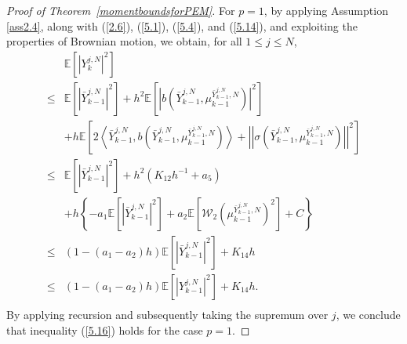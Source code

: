 \documentclass[12pt]{article}
\numberwithin{equation}{section}
\begin{document}
\begin{proof}[Proof of Theorem~\ref{momentboundsforPEM}]
For $p=1$, by applying Assumption \ref{ass2.4}, along with (\ref{2.6}), (\ref{5.1}), (\ref{5.4}), and (\ref{5.14}), and exploiting the properties of Brownian motion, we obtain, for all $1\leq j\leq N$,\\
\begin{equation}\tag{5.64}\label{5.17}
\begin{aligned}
&\mathbb{E} \left[\left| Y_{k}^{j,N} \right|^2\right] \\
\leq& \mathbb{E} \left[\left| \bar{Y}_{k-1}^{j,N} \right|^2\right]+h^{2}\mathbb{E} \left[\left|b\left(\bar{Y}^{j,N}_{k-1},\mu^{\bar{Y}^{j,N}_{k-1},N}_{k-1}\right) \right|^2\right]\\
&+h\mathbb{E} \left[2\left \langle \bar{Y}_{k-1}^{j,N},b\left( \bar{Y}_{k-1}^{j,N},\mu _{k-1}^{\bar{Y}_{k-1}^{j,N},N} \right) \right \rangle +\left|\left| \sigma \left( \bar{Y}_{k-1}^{j,N},\mu _{k-1}^{\bar{Y}_{k-1}^{j,N},N} \right)  \right|\right|^2\right]\\
\le&  \mathbb{E} \left[\left| \bar{Y}_{k-1}^{j,N} \right|^2\right]+h^{2}\left(K_{12} h^{-1}+a_5\right)\\
&+h\left\{ -a_1\mathbb{E} \left[\left|\bar{Y}_{k-1}^{j,N}\right|^2\right]+a_2\mathbb{E} \left[\mathcal{W}_2\left( \mu _{k-1}^{\bar{Y}_{k-1}^{j,N},N} \right) ^2\right]+C \right\}\\
 \leq&\left(1-\left(a_1-a_2\right) h\right)\mathbb{E}\left[\left|\bar{Y}^{j,N}_{k-1}\right|^2\right]+K_{14} h \\
\leq&\left(1-\left(a_1-a_2\right) h\right)\mathbb{E}\left[\left|Y_{k-1}^{j,N}\right|^2\right]+K_{14} h.\\
\end{aligned}
\end{equation}
By applying recursion and subsequently taking the supremum over $ j $, we conclude that inequality (\ref{5.16}) holds for the case $p=1$.



\end{proof}
\end{document}
